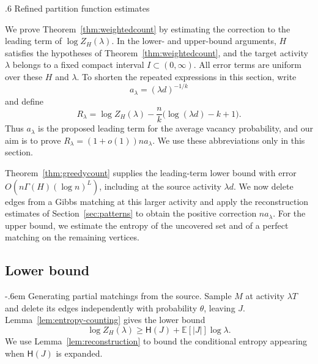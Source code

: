 \documentclass[11pt,reqno]{amsart}
\makeatletter
\numberwithin{equation}{section}
\renewcommand{\section}{\@startsection{section}{1}%
    \z@{1.3\linespacing\@plus.5\linespacing\@minus.2\linespacing}%
    {.6\linespacing}%
    {\normalfont\scshape\centering}}
\renewcommand{\paragraph}{\@startsection{paragraph}{4}%
    \z@{.75\linespacing\@plus.2\linespacing\@minus.1\linespacing}%
    {-.6em}%
    {\normalfont\bfseries}}
\theoremstyle{plain}
\theoremstyle{definition}
\newcommand{\E}{\mathbb E}
\newcommand{\HH}{\mathsf H}
\makeatother
\begin{document}

\section{Refined partition function estimates}\label{sec:counting}

We prove Theorem~\ref{thm:weightedcount} by estimating the correction to the leading term of $\log Z_H(\lambda)$.
In the lower- and upper-bound arguments, $H$ satisfies the hypotheses of Theorem~\ref{thm:weightedcount}, and the target activity $\lambda$ belongs to a fixed compact interval $I\subset(0,\infty)$. All error terms are uniform over these $H$ and $\lambda$.
To shorten the repeated expressions in this section, write
\[
    a_\lambda=(\lambda d)^{-1/k}
\]
and define
\begin{equation}\label{eq:counting-remainder}
    R_\lambda=\log Z_H(\lambda)-\frac nk\bigl(\log(\lambda d)-k+1\bigr).
\end{equation}
Thus $a_\lambda$ is the proposed leading term for the average vacancy probability, and our aim is to prove $R_\lambda=(1+o(1))na_\lambda$.
We use these abbreviations only in this section.

Theorem~\ref{thm:greedycount} supplies the leading-term lower bound with error $O(n\Gamma(H)(\log n)^L)$, including at the source activity $\lambda d$.
We now delete edges from a Gibbs matching at this larger activity and apply the reconstruction estimates of Section~\ref{sec:patterns} to obtain the positive correction $na_\lambda$.
For the upper bound, we estimate the entropy of the uncovered set and of a perfect matching on the remaining vertices.


\subsection{Lower bound}\label{subsec:countlower}

\paragraph{Generating partial matchings from the source.}
Sample $M$ at activity $\lambda T$ and delete its edges independently with probability $\theta$, leaving $J$.
Lemma~\ref{lem:entropy-counting} gives the lower bound
\[
    \log Z_H(\lambda)\ge\HH(J)+\E[|J|]\log\lambda.
\]
We use Lemma~\ref{lem:reconstruction} to bound the conditional entropy appearing when $\HH(J)$ is expanded.
\end{document}
